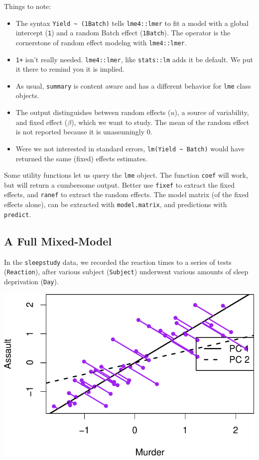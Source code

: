 \documentclass[]{book}
\providecommand{\tightlist}{%
  \setlength{\itemsep}{0pt}\setlength{\parskip}{0pt}}
\theoremstyle{definition}
\theoremstyle{definition}
\theoremstyle{definition}
\theoremstyle{remark}
\begin{document}
Things to note:

\begin{itemize}
\tightlist
\item
  The syntax \texttt{Yield\ \textasciitilde{}\ (1\textbar{}Batch)} tells \texttt{lme4::lmer} to fit a model with a global intercept (\texttt{1}) and a random Batch effect (\texttt{1\textbar{}Batch}). The \texttt{\textbar{}} operator is the cornerstone of random effect modelng with \texttt{lme4::lmer}.
\item
  \texttt{1+} isn't really needed. \texttt{lme4::lmer}, like \texttt{stats::lm} adds it be default. We put it there to remind you it is implied.
\item
  As usual, \texttt{summary} is content aware and has a different behavior for \texttt{lme} class objects.
\item
  The output distinguishes between random effects (\(u\)), a source of variability, and fixed effect (\(\beta\)), which we want to study. The mean of the random effect is not reported because it is unassumingly 0.
\item
  Were we not interested in standard errors, \texttt{lm(Yield\ \textasciitilde{}\ Batch)} would have returned the same (fixed) effects estimates.
\end{itemize}

Some utility functions let us query the \texttt{lme} object.
The function \texttt{coef} will work, but will return a cumbersome output. Better use \texttt{fixef} to extract the fixed effects, and \texttt{ranef} to extract the random effects.
The model matrix (of the fixed effects alone), can be extracted with \texttt{model.matrix}, and predictions with \texttt{predict}.

\hypertarget{a-full-mixed-model}{%
\subsection{A Full Mixed-Model}\label{a-full-mixed-model}}

In the \texttt{sleepstudy} data, we recorded the reaction times to a series of tests (\texttt{Reaction}), after various subject (\texttt{Subject}) underwent various amounts of sleep deprivation (\texttt{Day}).

\includegraphics[width=0.5\linewidth]{Rcourse_files/figure-latex/unnamed-chunk-200-1}
\end{document}
